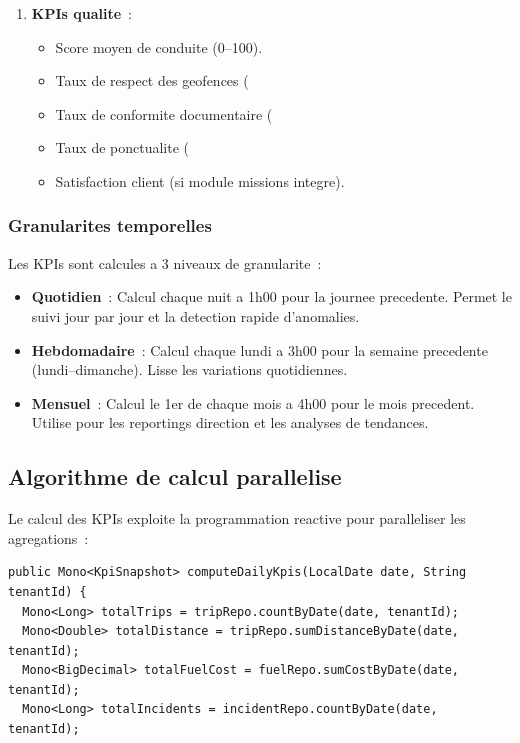 \documentclass[12pt,a4paper]{report}
\begin{document}
\begin{enumerate}[leftmargin=2cm]
\begin{enumerate}[leftmargin=2cm]
  \item \textbf{KPIs qualite}~:
        \begin{itemize}
          \item Score moyen de conduite (0--100).
          \item Taux de respect des geofences (%
          \item Taux de conformite documentaire (%
          \item Taux de ponctualite (%
          \item Satisfaction client (si module missions integre).
        \end{itemize}
\end{enumerate}

\subsubsection{Granularites temporelles}

Les KPIs sont calcules a 3 niveaux de granularite~:

\begin{itemize}[leftmargin=2cm]
  \item \textbf{Quotidien}~: Calcul chaque nuit a 1h00 pour la journee precedente.
        Permet le suivi jour par jour et la detection rapide d'anomalies.
        
  \item \textbf{Hebdomadaire}~: Calcul chaque lundi a 3h00 pour la semaine
        precedente (lundi--dimanche). Lisse les variations quotidiennes.
        
  \item \textbf{Mensuel}~: Calcul le 1er de chaque mois a 4h00 pour le mois
        precedent. Utilise pour les reportings direction et les analyses
        de tendances.
\end{itemize}

\subsection{Algorithme de calcul parallelise}

Le calcul des KPIs exploite la programmation reactive pour paralleliser
les agregations~:

\begin{verbatim}
public Mono<KpiSnapshot> computeDailyKpis(LocalDate date, String tenantId) {
  Mono<Long> totalTrips = tripRepo.countByDate(date, tenantId);
  Mono<Double> totalDistance = tripRepo.sumDistanceByDate(date, tenantId);
  Mono<BigDecimal> totalFuelCost = fuelRepo.sumCostByDate(date, tenantId);
  Mono<Long> totalIncidents = incidentRepo.countByDate(date, tenantId);
  

\end{verbatim}
\end{enumerate}
\end{document}
